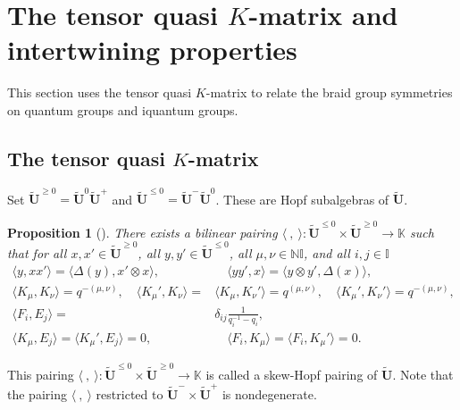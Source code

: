 \documentclass[a4paper,reqno,12pt]{amsart}
\numberwithin{equation}{section}
\newtheorem{proposition}{Proposition}[section]
\theoremstyle{definition}
\theoremstyle{plain}
\theoremstyle{definition}
\def\K{\mathbb K}
\def\N{\mathbb N}
\def\I{\mathbb I}
\def\tU{\widetilde{\mathbf U}}
\def\tTT{\widetilde{\mathbf T}}
\newcommand{\redtext}[1]{\textcolor{red}{#1}}
\newcommand{\red}[1]{\redtext{ #1}}
\begin{document}

\section{The tensor quasi \texorpdfstring{$K$}{K}-matrix and intertwining properties}
\label{sec:tensor K}

This section uses the tensor quasi $K$-matrix to relate the braid group symmetries on quantum groups and iquantum groups.

\subsection{The tensor quasi \texorpdfstring{$K$}{K}-matrix}
Set $\tU^{\ge0}=\tU^0 \tU^+$ and $\tU^{\le0}=\tU^-\tU^0$. These are Hopf subalgebras of $\tU$. 
\begin{proposition}[{\cite[Proposition 1.2.3]{Lus93}}]\label{bilinear form}
     There exists a bilinear pairing $\langle \ ,\ \rangle : \tU^{\leq 0} \times \tU^{\geq 0} \rightarrow \K$ such that for all $x, x' \in \tU^{\geq 0}$, all $y, y' \in \tU^{\leq 0}$, all $\mu, \nu \in \N\I$, and all $i,j\in \I$
     \begin{align}
         \langle y, xx'\rangle = \langle\Delta(y), x' \otimes x\rangle,& \quad \langle yy', x\rangle = \langle y \otimes y', \Delta(x)\rangle,\label{eq:form-kow}\\
         \langle K_\mu, K_\nu\rangle = q^{-(\mu, \nu)}, \quad \langle K_\mu', K_\nu\rangle =&\langle K_\mu, K_\nu'\rangle= q^{(\mu, \nu)},\quad \langle K_\mu', K_\nu'\rangle = q^{-(\mu, \nu)},\\
         \langle F_i, E_j\rangle =& \delta_{ij}\frac{1}{q_i^{-1}-q_i},\\
         \langle K_\mu, E_j\rangle=\langle K_\mu', E_j\rangle = 0, &\quad \langle F_i, K_\mu\rangle =\langle F_i, K_\mu'\rangle= 0.
     \end{align}
\end{proposition}

This pairing $\langle \ ,\ \rangle : \tU^{\leq 0} \times \tU^{\geq 0} \rightarrow \K$ is called a skew-Hopf pairing of $\tU$. Note that the pairing $\langle \ ,\ \rangle$ restricted to $\tU^- \times \tU^+$ is nondegenerate.
\end{document}
